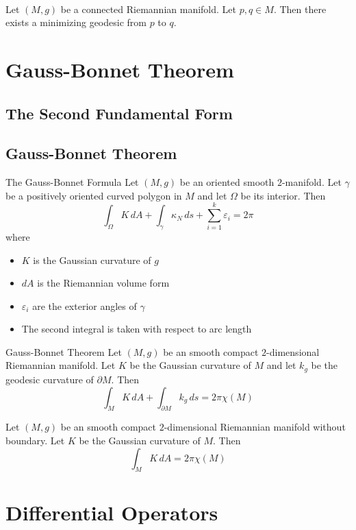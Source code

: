 \documentclass[a4paper]{article}
\begin{document}
\begin{prp}{}{}\\
Let $(M,g)$ be a connected Riemannian manifold. Let $p,q\in M$. Then there exists a minimizing geodesic from $p$ to $q$. 
\end{prp}

\pagebreak
\section{Gauss-Bonnet Theorem}
\subsection{The Second Fundamental Form}

\subsection{Gauss-Bonnet Theorem}
\begin{thm}{The Gauss-Bonnet Formula}{} Let $(M,g)$ be an oriented smooth $2$-manifold. Let $\gamma$ be a positively oriented curved polygon in $M$ and let $\Omega$ be its interior. Then $$\int_\Omega K\,dA+\int_\gamma\kappa_N\,ds+\sum_{i=1}^k\varepsilon_i=2\pi$$ where 
\begin{itemize}
\item $K$ is the Gaussian curvature of $g$
\item $dA$ is the Riemannian volume form
\item $\varepsilon_i$ are the exterior angles of $\gamma$
\item The second integral is taken with respect to arc length
\end{itemize}	
\end{thm}

\begin{thm}{Gauss-Bonnet Theorem}{} Let $(M,g)$ be an smooth compact $2$-dimensional Riemannian manifold. Let $K$ be the Gaussian curvature of $M$ and let $k_g$ be the geodesic curvature of $\partial M$. Then $$\int_MK\,dA+\int_{\partial M}k_g\,ds=2\pi\chi(M)$$
\end{thm}

\begin{crl}{}{} Let $(M,g)$ be an smooth compact $2$-dimensional Riemannian manifold without boundary. Let $K$ be the Gaussian curvature of $M$. Then $$\int_MK\,dA=2\pi\chi(M)$$
\end{crl}

\pagebreak
\section{Differential Operators}
\end{document}
